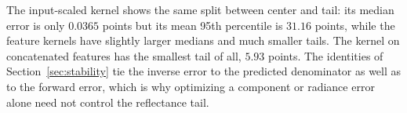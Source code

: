 The input-scaled kernel shows the same split between center and tail: its median error is only
$0.0365$ points but its mean 95th percentile is $31.16$ points, while the feature kernels have
slightly larger medians and much smaller tails. The kernel on concatenated features has the
smallest tail of all, $5.93$ points. The identities of Section~\ref{sec:stability} tie the
inverse error to the predicted denominator as well as to the forward error, which is why
optimizing a component or radiance error alone need not control the reflectance tail.
